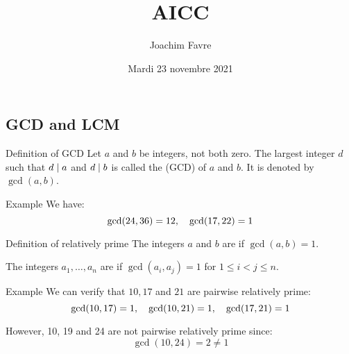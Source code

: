 \documentclass[a4paper]{article}
\title{AICC}
\author{Joachim Favre}
\date{Mardi 23 novembre 2021}
\begin{document}
\maketitle


\subsection{GCD and LCM}
\begin{parag}{Definition of GCD}
    Let $a$ and $b$ be integers, not both zero. The largest integer $d$ such that $d \mid a$ and $d \mid b$ is called the  (GCD) of $a$ and $b$. It is denoted by $\gcd\left(a, b\right)$.
\end{parag}

\begin{parag}{Example}
    We have: 
    \[\gcd\left(24, 36\right) = 12, \mathspace \gcd\left(17, 22\right) = 1\]
\end{parag}

\begin{parag}{Definition of relatively prime}
    The integers $a$ and $b$ are  if $\gcd\left(a, b\right) = 1$.

    The integers $a_1, \ldots, a_n$ are  if $\gcd\left(a_i, a_j\right) = 1$ for $1 \leq i < j \leq n$.
\end{parag}

\begin{parag}{Example}
    We can verify that $10, 17$ and $21$ are pairwise relatively prime: 
    \[\gcd\left(10, 17\right) = 1, \mathspace \gcd\left(10, 21\right) = 1, \mathspace \gcd\left(17, 21\right) = 1\]
    
    However, 10, 19 and 24 are not pairwise relatively prime since: 
    \[\gcd\left(10, 24\right) = 2 \neq 1\]
\end{parag}
\end{document}
